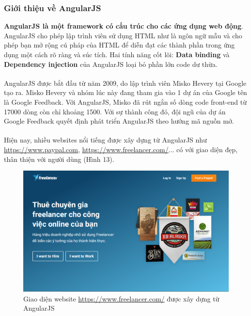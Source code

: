 \documentclass[a4paper]{article}
\begin{document}
\subsubsection{Giới thiệu về AngularJS}
\textbf{AngularJS là một framework có cấu trúc cho các ứng dụng web động}. AngularJS cho phép lập trình viên sử dụng HTML như là ngôn ngữ mẫu và cho phép bạn mở rộng cú pháp của HTML để diễn đạt các thành phần trong ứng dụng một cách rõ ràng và súc tích. Hai tính năng cốt lõi: \textbf{Data binding} và \textbf{Dependency injection} của AngularJS loại bỏ phần lớn code dư thừa.\\
\\
AngularJS được bắt đầu từ năm 2009, do lập trình viên Misko Hevery tại Google tạo ra. Misko Hevery và nhóm lúc này đang tham gia vào 1 dự án của Google tên là Google Feedback. Với AngularJS, Misko đã rút ngắn số dòng code front-end từ 17000 dòng còn chỉ khoảng 1500. Với sự thành công đó, đội ngũ của dự án Google Feedback quyết định phát triển AngularJS theo hướng mã nguồn mở.\\
\\
Hiện nay, nhiều websites nổi tiếng được xây dựng từ AngularJS như \url{https://www.paypal.com}, \url{https://www.freelancer.com/}... có với giao diện đẹp, thân thiện với người dùng (Hình 13).
\begin{center}
    \begin{figure}[h]
    \begin{center}
     \includegraphics[scale=.4]{freelancer.PNG}
    \end{center}
    \caption{Giao diện website \url{https://www.freelancer.com/} được xây dựng từ AngularJS}
    \label{refhinh2}
    \end{figure}
\end{center}
\end{document}
